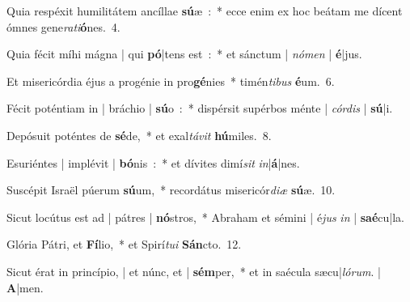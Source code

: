 ﻿\item Quia respéxit humilitátem ancíllae \textbf{sú}æ~:~*
ecce enim ex hoc beátam me dícent ómnes gene\emph{ra}\emph{ti}\textbf{ó}nes.~4.
\item Quia fécit míhi mágna | qui \textbf{pó}|tens est~:~*
et sánctum | \emph{nó}\emph{men} | \textbf{é}|jus.
\item Et misericórdia éjus a progénie in pro\textbf{gé}nies~*
timén\emph{ti}\emph{bus} \textbf{é}um.~6.
\item Fécit poténtiam in | bráchio | \textbf{sú}o~:~*
dispérsit supérbos ménte | \emph{cór}\emph{dis} | \textbf{sú}|i.
\item Depósuit poténtes de \textbf{sé}de,~*
et exal\emph{tá}\emph{vit} \textbf{hú}miles.~8.
\item Esuriéntes | implévit | \textbf{bó}nis~:~*
et dívites dimí\emph{sit} \emph{in}|\textbf{á}|nes.
\item Suscépit Israël púerum \textbf{sú}um,~*
recordátus misericór\emph{di}\emph{æ} \textbf{sú}æ.~10.
\item Sicut locútus est ad | pátres | \textbf{nó}stros,~*
Abraham et sémini | é\emph{jus} \emph{in} | \textbf{saé}cu|la.
\item Glória Pátri, et \textbf{Fí}lio,~*
et Spirí\emph{tu}\emph{i} \textbf{Sán}cto.~12.
\item Sicut érat in princípio, | et núnc, et | \textbf{sém}per,~*
et in saécula sæcu|\emph{ló}\emph{rum}. | \textbf{A}|men.
